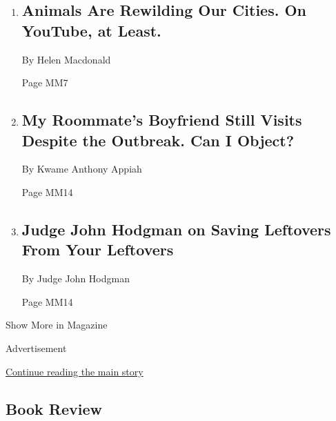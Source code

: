 \begin{enumerate}
\def\labelenumi{\arabic{enumi}.}
\item
  \href{/2020/04/15/magazine/quarantine-animal-videos-coronavirus.html}{}

  \hypertarget{animals-are-rewilding-our-cities-on-youtube-at-least}{%
  \subsection{Animals Are Rewilding Our Cities. On YouTube, at
  Least.}\label{animals-are-rewilding-our-cities-on-youtube-at-least}}

  By Helen Macdonald

  Page MM7
\item
  \href{/2020/04/14/magazine/sheltering-at-home-roommate-social-distancing-coronavrius.html}{}

  \hypertarget{my-roommates-boyfriend-still-visits-despite-the-outbreak-can-i-object}{%
  \subsection{My Roommate's Boyfriend Still Visits Despite the Outbreak.
  Can I
  Object?}\label{my-roommates-boyfriend-still-visits-despite-the-outbreak-can-i-object}}

  By Kwame Anthony Appiah

  Page MM14
\item
  \href{/2020/04/16/magazine/judge-john-hodgman-on-saving-leftovers-from-your-leftovers.html}{}

  \hypertarget{judge-john-hodgman-on-saving-leftovers-from-your-leftovers}{%
  \subsection{Judge John Hodgman on Saving Leftovers From Your
  Leftovers}\label{judge-john-hodgman-on-saving-leftovers-from-your-leftovers}}

  By Judge John Hodgman

  Page MM14
\end{enumerate}

Show More in Magazine

Advertisement

\protect\hyperlink{after-mid6}{Continue reading the main story}

\hypertarget{book-review}{%
\subsection{Book Review}\label{book-review}}

